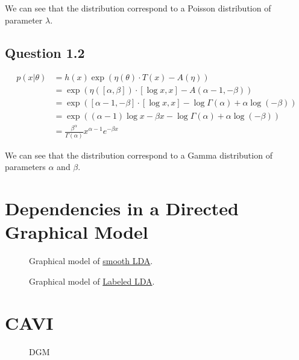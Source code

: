 \documentclass{article}
\begin{document}
We can see that the distribution correspond to a Poisson distribution of parameter $\lambda$.

\subsection{Question 1.2}

\begin{equation}
    \begin{split}
        p(x|\theta) & = h(x) \exp(\eta(\theta) \cdot T(x) - A(\eta))                                             \\
                    & = \exp(\eta([\alpha, \beta]) \cdot [\log x, x] - A(\alpha - 1, -\beta))                    \\
                    & = \exp([\alpha - 1, -\beta] \cdot [\log x, x] - \log \Gamma(\alpha) + \alpha \log(-\beta)) \\
                    & = \exp((\alpha - 1) \log x - \beta x - \log \Gamma(\alpha) + \alpha \log(-\beta))          \\
                    & = \frac{\beta^\alpha}{\Gamma(\alpha)} x^{\alpha - 1} e^{-\beta x}
    \end{split}
\end{equation}

We can see that the distribution correspond to a Gamma distribution of parameters $\alpha$ and $\beta$.

\section{Dependencies in a Directed Graphical Model}

\begin{figure}[H]
    \centering
    
    \caption{Graphical model of \href{https://www.jmlr.org/papers/volume3/blei03a/blei03a.pdf}{smooth LDA}.}
    \label{fig:fig1}
\end{figure}

\begin{figure}[H]
    \centering
    
    \caption{Graphical model of \href{https://aclanthology.org/D09-1026.pdf}{Labeled LDA}.}
    \label{fig:fig2}
\end{figure}

\section{CAVI}

\begin{figure}[H]
    \centering
    
    \caption{DGM}
    \label{fig:fig3}
\end{figure}
\end{document}
